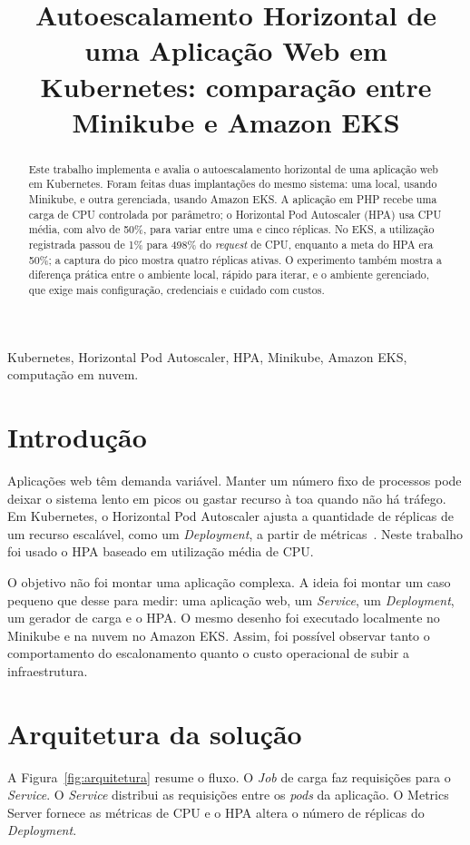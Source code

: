 \documentclass[conference]{IEEEtran}
\title{Autoescalamento Horizontal de uma Aplicação Web em Kubernetes: comparação entre Minikube e Amazon EKS}
\author{\IEEEauthorblockN{Mario Marszalek}
\IEEEauthorblockA{PSI5120 -- Tópicos em Computação em Nuvem\\
Escola Politécnica -- Universidade de São Paulo\\
NUSP: 11910490 -- mariomarszalek@usp.br}}
\begin{document}
\maketitle

\begin{abstract}
Este trabalho implementa e avalia o autoescalamento horizontal de uma aplicação web em Kubernetes. Foram feitas duas implantações do mesmo sistema: uma local, usando Minikube, e outra gerenciada, usando Amazon EKS. A aplicação em PHP recebe uma carga de CPU controlada por parâmetro; o Horizontal Pod Autoscaler (HPA) usa CPU média, com alvo de 50\%, para variar entre uma e cinco réplicas. No EKS, a utilização registrada passou de 1\% para 498\% do \textit{request} de CPU, enquanto a meta do HPA era 50\%; a captura do pico mostra quatro réplicas ativas. O experimento também mostra a diferença prática entre o ambiente local, rápido para iterar, e o ambiente gerenciado, que exige mais configuração, credenciais e cuidado com custos.
\end{abstract}

\begin{IEEEkeywords}
Kubernetes, Horizontal Pod Autoscaler, HPA, Minikube, Amazon EKS, computação em nuvem.
\end{IEEEkeywords}

\section{Introdução}
Aplicações web têm demanda variável. Manter um número fixo de processos pode deixar o sistema lento em picos ou gastar recurso à toa quando não há tráfego. Em Kubernetes, o Horizontal Pod Autoscaler ajusta a quantidade de réplicas de um recurso escalável, como um \textit{Deployment}, a partir de métricas~\cite{k8s-hpa}. Neste trabalho foi usado o HPA baseado em utilização média de CPU.

O objetivo não foi montar uma aplicação complexa. A ideia foi montar um caso pequeno que desse para medir: uma aplicação web, um \textit{Service}, um \textit{Deployment}, um gerador de carga e o HPA. O mesmo desenho foi executado localmente no Minikube e na nuvem no Amazon EKS. Assim, foi possível observar tanto o comportamento do escalonamento quanto o custo operacional de subir a infraestrutura.

\section{Arquitetura da solução}
A Figura~\ref{fig:arquitetura} resume o fluxo. O \textit{Job} de carga faz requisições para o \textit{Service}. O \textit{Service} distribui as requisições entre os \textit{pods} da aplicação. O Metrics Server fornece as métricas de CPU e o HPA altera o número de réplicas do \textit{Deployment}.
\end{document}
